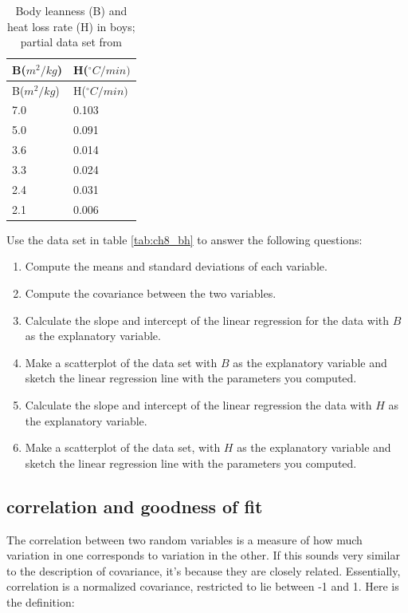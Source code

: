 \documentclass[
  letterpaper,
  DIV=11,
  numbers=noendperiod]{scrreprt}
\begin{document}
\begin{longtable}[]{@{}ll@{}}
\caption{Body leanness (B) and heat loss rate (H) in boys; partial data
set from \cite{sloan_cooling_1973}}\tabularnewline
\toprule()
B(\(m^2/kg\)) & H(\(^\circ C /min)\) \\
\midrule()
\endfirsthead
\toprule()
B(\(m^2/kg\)) & H(\(^\circ C /min)\) \\
\midrule()
\endhead
7.0 & 0.103 \\
5.0 & 0.091 \\
3.6 & 0.014 \\
3.3 & 0.024 \\
2.4 & 0.031 \\
2.1 & 0.006 \\
\bottomrule()
\end{longtable}

\label{tab:ch8_bh}

Use the data set in table \ref{tab:ch8_bh} to answer the following
questions:

\begin{enumerate}
\def\labelenumi{\arabic{enumi}.}
\item
  Compute the means and standard deviations of each variable.
\item
  Compute the covariance between the two variables.
\item
  Calculate the slope and intercept of the linear regression for the
  data with \(B\) as the explanatory variable.
\item
  Make a scatterplot of the data set with \(B\) as the explanatory
  variable and sketch the linear regression line with the parameters you
  computed.
\item
  Calculate the slope and intercept of the linear regression the data
  with \(H\) as the explanatory variable.
\item
  Make a scatterplot of the data set, with \(H\) as the explanatory
  variable and sketch the linear regression line with the parameters you
  computed.
\end{enumerate}

\hypertarget{correlation-and-goodness-of-fit}{%
\subsection{correlation and goodness of
fit}\label{correlation-and-goodness-of-fit}}

The correlation between two random variables is a measure of how much
variation in one corresponds to variation in the other. If this sounds
very similar to the description of covariance, it's because they are
closely related. Essentially, correlation is a normalized covariance,
restricted to lie between -1 and 1. Here is the definition:
\end{document}
